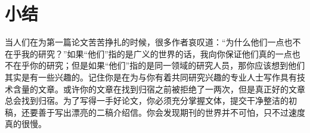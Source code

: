 \section{小结}
当人们在为第一篇论文苦苦挣扎的时候，很多作者哀叹道：“为什么他们一点也不在乎我的研究？”如果“他们”指的是广义的世界的话，我向你保证他们真的一点也不在乎你的研究；但是如果“他们”指的是同一领域的研究人员，那你应该想到他们其实是有一些兴趣的。记住你是在为与你有着共同研究兴趣的专业人士写作具有技术含量的文章。或许你的文章在找到归宿之前被拒绝了一两次，但是真正好的文章总会找到归宿。为了写得一手好论文，你必须充分掌握文体，提交干净整洁的初稿，还要善于写出漂亮的二稿介绍信。你会发现期刊的世界并不可怕，只不过速度真的很慢。